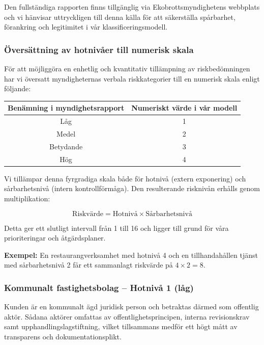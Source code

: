 \documentclass{article}
\begin{document}
Den fullständiga rapporten finns tillgänglig via Ekobrottsmyndighetens webbplats och vi hänvisar uttryckligen till denna källa för att säkerställa spårbarhet, förankring och legitimitet i vår klassificeringsmodell.

\subsubsection*{Översättning av hotnivåer till numerisk skala}

För att möjliggöra en enhetlig och kvantitativ tillämpning av riskbedömningen har vi översatt myndigheternas verbala riskkategorier till en numerisk skala enligt följande:

\begin{center}
\begin{tabular}{|c|c|}
\hline
\textbf{Benämning i myndighetsrapport} & \textbf{Numeriskt värde i vår modell} \\
\hline
Låg & 1 \\
Medel & 2 \\
Betydande & 3 \\
Hög & 4 \\
\hline
\end{tabular}
\end{center}

Vi tillämpar denna fyrgradiga skala både för hotnivå (extern exponering) och sårbarhetsnivå (intern kontrollförmåga). Den resulterande risknivån erhålls genom multiplikation:

\[
\text{Riskvärde} = \text{Hotnivå} \times \text{Sårbarhetsnivå}
\]

Detta ger ett slutligt intervall från 1 till 16 och ligger till grund för våra prioriteringar och åtgärdsplaner.

\begin{tcolorbox}
\textbf{Exempel:} En restaurangverksamhet med hotnivå 4 och en tillhandahållen tjänst med sårbarhetsnivå 2 får ett sammanlagt riskvärde på \(4 \times 2 = 8\).
\end{tcolorbox}



\subsubsection*{Kommunalt fastighetsbolag – Hotnivå 1 (låg)}

Kunden är en kommunalt ägd juridisk person och betraktas därmed som offentlig aktör. Sådana aktörer omfattas av offentlighetsprincipen, interna revisionskrav samt upphandlingslagstiftning, vilket tillsammans medför ett högt mått av transparens och dokumentationsplikt. 
\end{document}
